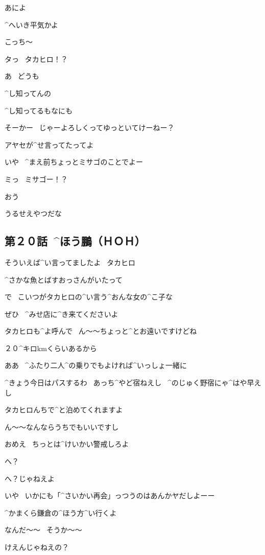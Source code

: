 \Y あによ

\Y ^{へいき}{平気}かよ

\A こっち〜

\page
\A タっ
\ タカヒロ！？

\A あ
\ どうも

\Y ^{し}{知}ってんの

\A ^{し}{知}ってるもなにも

\Y そーかー
\ じゃーよろしくってゆっといてけーねー？

\page
\Y アヤセが^{せ}{言}ってたってよ

\Y いや
\ ^{まえ}{前}ちょっとミサゴのことでよー

\A ミっ
\ ミサゴー！？

\Y おう

\Y うるせえやつだな


\subsection{第２０話\ ^{ほう}{鵬}（ＨＯＨ）}


\page[68]
\A そういえば^{い}{言}ってましたよ
\ タカヒロ

\A ^{さかな}{魚}とばすおっさんがいたって

\Y で
\ こいつがタカヒロの^{い}{言}う^{おんな}{女}の^{こ}{子}な

\page
\A ぜひ
\ ^{みせ}{店}に^{き}{来}てくださいよ

\A タカヒロも^{よ}{呼}んで
\ ん〜〜ちょっと^{とお}{遠}いですけどね

\A ２０^{キロ}{km}くらいあるから

\A ああ
\ ^{ふたり}{二人}^{の}{乗}りでもよければ^{いっしょ}{一緒}に

\Y ^{きょう}{今日}はパスするわ
\ あっち^{やど}{宿}ねえし
\ ^{のじゅく}{野宿}にゃ^{はや}{早}えし

\page
\A タカヒロんちで^{と}{泊}めてくれますよ

\A ん〜〜なんならうちでもいいですし

\Y おめえ
\ ちっとは^{けいかい}{警戒}しろよ

\A へ？

\Y へ？じゃねえよ

\Y いや
\ いかにも「^{さいかい}{再会}」っつうのはあんかヤだしよーー

\Y ^{かまくら}{鎌倉}の^{ほう}{方}^{い}{行}くよ

\A なんだ〜〜
\ そうか〜〜

\page
\Y けえんじゃねえの？

